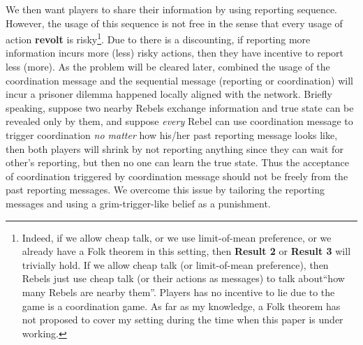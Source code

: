 \documentclass[12pt,letter]{article}
\theoremstyle{remark}
\theoremstyle{remark}
\theoremstyle{claim}
\begin{document}
We then want players to share their information by using reporting sequence. However, the usage of this sequence is not free in the sense that every usage of action \textbf{revolt} is risky\footnote{Indeed, if we allow cheap talk, or we use limit-of-mean preference, or we already have a Folk theorem in this setting, then \textbf{Result 2} or \textbf{Result 3} will trivially hold. If we allow cheap talk (or limit-of-mean preference), then Rebels just use cheap talk (or their actions as messages) to talk about``how many Rebels are nearby them''. Players has no incentive to lie due to the game is a coordination game. As far as my knowledge, a Folk theorem has not proposed to cover my setting during the time when this paper is under working. }. Due to there is a discounting, if reporting more information incurs more (less) risky actions, then they have incentive to report less (more). As the problem will be cleared later, combined the usage of the coordination message and the sequential message (reporting or coordination) will incur a prisoner dilemma happened locally aligned with the network. Briefly speaking, suppose two nearby Rebels exchange information and true state can be revealed only by them, and suppose \textit{every} Rebel can use coordination message to trigger coordination \textit{no matter} how his/her past reporting message looks like, then both players will shrink by not reporting anything since they can wait for other's reporting, but then no one can learn the true state. Thus the acceptance of coordination triggered by coordination message should not be freely from the past reporting messages. We overcome this issue by tailoring the reporting messages and using a grim-trigger-like belief as a punishment.
\end{document}
